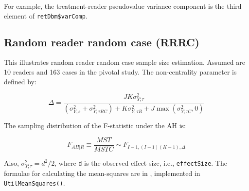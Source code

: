 \documentclass[
]{book}
\newenvironment{Shaded}{\begin{snugshade}}{\end{snugshade}}
\newcommand{\CommentTok}[1]{\textcolor[rgb]{0.56,0.35,0.01}{\textit{#1}}}
\newcommand{\NormalTok}[1]{#1}
\newcommand{\OperatorTok}[1]{\textcolor[rgb]{0.81,0.36,0.00}{\textbf{#1}}}
\begin{document}
\begin{Shaded}
\end{Shaded}

For example, the treatment-reader pseudovalue variance component is the third element of \texttt{retDbm\$varComp}.

\hypertarget{random-reader-random-case-rrrc}{%
\subsection{Random reader random case (RRRC)}\label{random-reader-random-case-rrrc}}

This illustrates random reader random case sample size estimation. Assumed are 10 readers and 163 cases in the pivotal study. The non-centrality parameter is defined by:

\begin{equation*} 
\Delta =\frac{JK\sigma _{Y;\tau }^{2}}{\left( \sigma _{Y;\varepsilon }^{2}+\sigma _{Y;\tau RC}^{2} \right)+K\sigma _{Y;\tau R}^{2}+J\max \left( \sigma _{Y;\tau C}^{2},0 \right)}
\end{equation*}

The sampling distribution of the F-statistic under the AH is:

\begin{equation*} 
{F_{\left. AH \right|R}}\equiv \frac{MST}{MSTC}\sim{F_{I-1,\left( I-1 \right)\left(K-1 \right),\Delta}}
\end{equation*}

Also, \(\sigma _{Y;\tau }^{2}={d^{2}}/2\), where \texttt{d} is the observed effect size, i.e., \texttt{effectSize}. The formulae for calculating the mean-squares are in \citep{RN1476}, implemented in \texttt{UtilMeanSquares()}.
\end{document}

